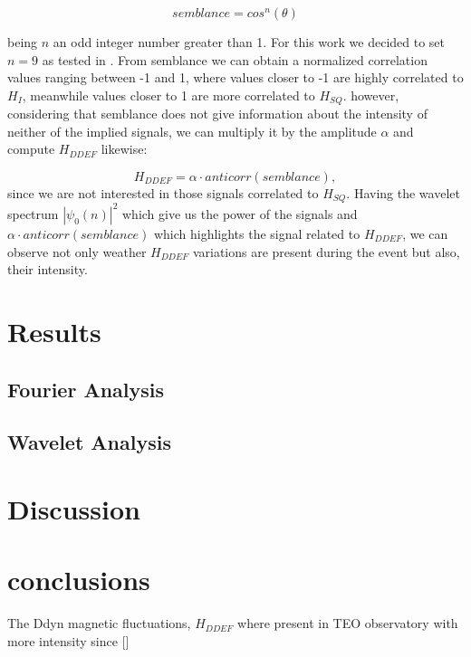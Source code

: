 \documentclass[a4paper]{article}
\theoremstyle{plain}
\theoremstyle{definition}
\begin{document}
	\begin{equation}
		semblance = cos ^n(\theta)
	\end{equation}
	
	\noindent being $n$ an odd integer number greater than 1. For this work we decided to set $n=9$ as tested in \cite{cooper_semblance}. From semblance we can obtain a normalized correlation values ranging between -1 and 1, where values closer to -1 are highly correlated to $H_I$, meanwhile values closer to 1 are more correlated to $H_{SQ}$. however, considering that semblance does not give information about the intensity of neither of the implied signals, we can multiply it by the amplitude $\alpha$ and compute $H_{DDEF}$ likewise:
	
	\begin{equation}
		H_{DDEF} = \alpha \cdot anticorr(semblance),
	\end{equation}
	\noindent since we are not interested in those signals correlated to $H_{SQ}$. Having the wavelet spectrum $|\psi_0(n)|^2$ which give us the power of the signals and $\alpha \cdot anticorr(semblance)$ which highlights the signal related to $H_{DDEF}$, we can observe not only weather $H_{DDEF}$ variations are present during the event but also, their intensity. 
	
	\section{Results}
	\label{sec:prev-results}
	\subsection{Fourier Analysis}

	\subsection{Wavelet Analysis}
	
	\section{Discussion}
	
	\section{conclusions}
	
	The Ddyn magnetic fluctuations, $H_{DDEF}$ where present in TEO observatory with more intensity since []\\
	
\end{document}
